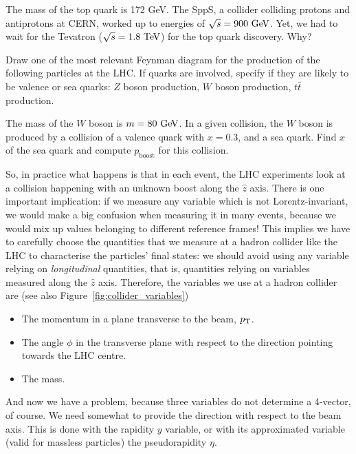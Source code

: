 \begin{mybox}
\begin{ExerciseList}
\Exercise The mass of the top quark is 172 GeV. The SppS, a collider colliding protons and antiprotons at CERN, worked up to energies of $\sqrt{s} = 900\ \text{Ge\kern -0.1em V}$. Yet, we had to wait for the Tevatron ($\sqrt{s} = 1.8\ \TeV$) for the top quark discovery. Why?

\Exercise Draw one of the most relevant Feynman diagram for the production of the following particles at the LHC. If quarks are involved, specify if they are likely to be valence or sea quarks: $Z$ boson production, $W$ boson production, $t\bar{t}$ production.

\Exercise The mass of the $W$ boson is $m = 80\ \text{Ge\kern -0.1em V}$. In a given collision, the $W$ boson is produced by a collision of a valence quark with $x = 0.3$,  and a sea quark. Find $x$ of the sea quark and compute $p_{\mathrm{boost}}$ for this collision.
\end{ExerciseList}
\end{mybox}

So, in practice what happens is that in each event, the LHC experiments look at a collision happening with an unknown boost along the $\hat{z}$ axis. There is one important implication: if we measure any variable which is not Lorentz-invariant, we would make a big confusion when measuring it in many events, because we would mix up values belonging to different reference frames! This implies we have to carefully choose the quantities that we measure at a hadron collider like the LHC to characterise the particles' final states: we should avoid using any variable relying on \textit{longitudinal} quantities, that is, quantities relying on variables measured along the $\hat{z}$ axis. Therefore, the variables we use at a hadron collider are (see also Figure~\ref{fig:collider_variables}) 

\begin{itemize}
\item The momentum in a plane transverse to the beam, $p_{\mathrm{T}}$.
\item The angle $\phi$ in the transverse plane with respect to the direction pointing towards the LHC centre.
\item The mass.
\end{itemize}

And now we have a problem, because three variables do not determine a 4-vector, of course. We need somewhat to provide the direction with respect to the beam axis. This is done with the rapidity $y$ variable, or with its approximated variable (valid for massless particles) the pseudorapidity $\eta$. 

